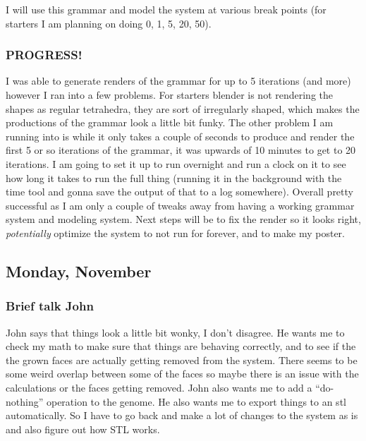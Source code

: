 \documentclass[letterpaper,oneside,titlepage]{article}
\begin{document}
I will use this grammar and model the system at various break points (for starters I am planning on doing 0, 1, 5, 20, 50).

\subsubsection{PROGRESS!}
I was able to generate renders of the grammar for up to 5 iterations (and more) however I ran into a few problems.  For starters blender is not rendering the shapes as regular tetrahedra, they are sort of irregularly shaped, which makes the productions of the grammar look a little bit funky.  The other problem I am running into is while it only takes a couple of seconds to produce and render the first 5 or so iterations of the grammar, it was upwards of 10 minutes to get to 20 iterations.  I am going to set it up to run overnight and run a clock on it to see how long it takes to run the full thing (running it in the background with the time tool and gonna save the output of that to a log somewhere).  Overall pretty successful as I am only a couple of tweaks away from having a working grammar system and modeling system.  Next steps will be to fix the render so it looks right, \emph{potentially} optimize the system to not run for forever, and to make my poster.


\subsection{Monday, November }

\subsubsection{Brief talk John}
John says that things look a little bit wonky, I don't disagree.  He wants me to check my math to make sure that things are behaving correctly, and to see if the the grown faces are actually getting removed from the system.  There seems to be some weird overlap between some of the faces so maybe there is an issue with the calculations or the faces getting removed.  John also wants me to add a ``do-nothing'' operation to the genome.  He also wants me to export things to an stl automatically.  So I have to go back and make a lot of changes to the system as is and also figure out how STL works.




\end{document}

